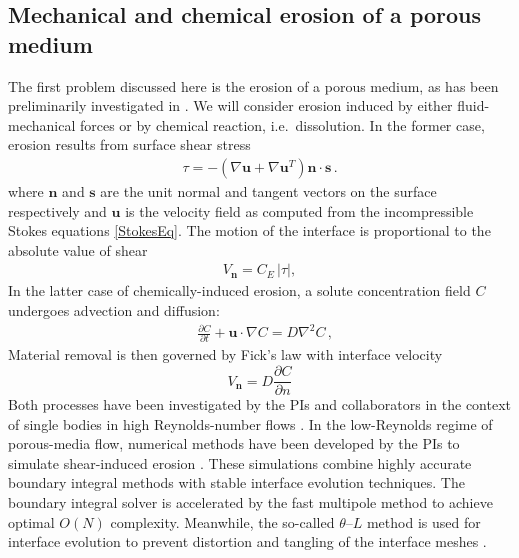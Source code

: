 \documentclass[11pt]{article}
\newcommand{\pd}[2]{ \frac{ \partial #1}{ \partial #2 } }
\newcommand{\bvec}[1]{{\mathbf{#1}}}
\newcommand{\grad}{\nabla}
\newcommand {\Lap} {\grad^2}
\newcommand{\abs}[1]{\left| #1 \right|}
\newcommand{\uu}{\bvec{u}}
\newcommand{\nn}{{\mathbf{n}}}
\renewcommand{\ss}{{\mathbf{s}}}
\newcommand{\Vn}{V_\nn}
\newcommand{\CE}{C_E}
\newcommand {\ny}{n}
\newcommand {\bdry} {\partial B}
\newcommand{\Diff}{D}
\newcommand{\thL}{$\theta$--$L$}
\begin{document}
\subsection{Mechanical and chemical erosion of a porous medium}


The first problem discussed here is the erosion of a porous medium, as has been preliminarily investigated in \cite{Quaife2018}. We will consider erosion induced by either fluid-mechanical forces or by chemical reaction, i.e.~dissolution. In the former case, erosion results from surface shear stress
\begin{align}
\tau = -\left(\nabla \uu + \nabla \uu^T \right)\nn \cdot \ss \, .
\end{align}
where $\nn$ and $\ss$ are the unit normal and tangent vectors on the surface respectively and $\uu$ is the velocity field as computed from the incompressible Stokes equations \eqref{StokesEq}. 
The motion of the interface is proportional to the absolute value of shear
\begin{align}
\Vn = \CE \, \abs{\tau},
\end{align}
In the latter case of chemically-induced erosion, a solute concentration field $C$ undergoes advection and diffusion:
\begin{align}
\label{Ceq}
& \pd{C}{t} + \uu \cdot \grad C = \Diff \Lap C \, ,
\end{align}
Material removal is then governed by Fick's law with interface velocity
\begin{equation}
\label{DissVn}
\Vn = \left. \Diff \pd{C}{\ny} \right. %
\end{equation}
Both processes have been investigated by the PIs and collaborators in the context of single bodies in high Reynolds-number flows \cite{Ristroph2012, MoorePOF2013, HuangJFM2015, MooreCPAM2017}. In the low-Reynolds regime of porous-media flow, numerical methods have been developed by the PIs to simulate shear-induced erosion \cite{Quaife2018}. These simulations combine highly accurate boundary integral methods with stable interface evolution techniques. The boundary integral solver is accelerated by the fast multipole method \cite{gre-rok1987, gre-gre-may1992} to achieve optimal $O(N)$ complexity. Meanwhile, the so-called {\thL} method is used for interface evolution to prevent distortion and tangling of the interface meshes \cite{hou1994removing, MoorePOF2013, Quaife2018}.
\end{document}
